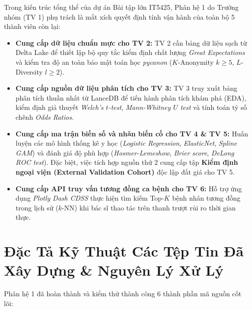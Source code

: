 \documentclass[11pt,a4paper]{article}
\begin{document}
Trong kiến trúc tổng thể của dự án Bài tập lớn IT5425, Phân hệ 1 do Trưởng nhóm (TV 1) phụ trách là mắt xích quyết định tính vận hành của toàn bộ 5 thành viên còn lại:
\begin{itemize}
    \item \textbf{Cung cấp dữ liệu chuẩn mực cho TV 2:} TV 2 cần bảng dữ liệu sạch từ Delta Lake để thiết lập bộ quy tắc kiểm định chất lượng \textit{Great Expectations} và kiểm tra độ an toàn bảo mật toán học \textit{pycanon} ($K$-Anonymity $k \ge 5$, $L$-Diversity $l \ge 2$).
    \item \textbf{Cung cấp nguồn dữ liệu phân tích cho TV 3:} TV 3 truy xuất bảng phân tích thuần nhất từ LanceDB để tiến hành phân tích khám phá (EDA), kiểm định giả thuyết \textit{Welch's $t$-test}, \textit{Mann-Whitney $U$ test} và tính toán tỷ số chênh \textit{Odds Ratios}.
    \item \textbf{Cung cấp ma trận biến số và nhãn biến cố cho TV 4 \& TV 5:} Huấn luyện các mô hình thống kê y học (\textit{Logistic Regression}, \textit{ElasticNet}, \textit{Spline GAM}) và đánh giá độ phù hợp (\textit{Hosmer-Lemeshow}, \textit{Brier score}, \textit{DeLong ROC test}). Đặc biệt, việc tích hợp nguồn thứ 2 cung cấp tập \textbf{Kiểm định ngoại viện (External Validation Cohort)} độc lập đắt giá cho TV 5.
    \item \textbf{Cung cấp API truy vấn tương đồng ca bệnh cho TV 6:} Hỗ trợ ứng dụng \textit{Plotly Dash CDSS} thực hiện tìm kiếm Top-$K$ bệnh nhân tương đồng trong lịch sử ($k$-NN) khi bác sĩ thao tác trên thanh trượt rủi ro thời gian thực.
\end{itemize}

\section{Đặc Tả Kỹ Thuật Các Tệp Tin Đã Xây Dựng \& Nguyên Lý Xử Lý}

Phân hệ 1 đã hoàn thành và kiểm thử thành công 6 thành phần mã nguồn cốt lõi:
\end{document}
